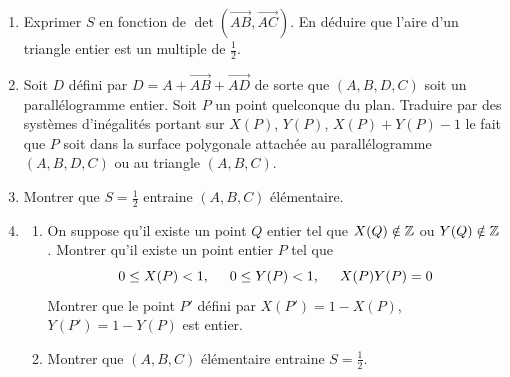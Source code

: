 \begin{enumerate}
 \item Exprimer $S$ en fonction de $\det(\overrightarrow{AB}, \overrightarrow{AC})$. En déduire que l'aire d'un triangle entier est un multiple de $\frac{1}{2}$.
 
 \item Soit $D$ défini par $D = A + \overrightarrow{AB} + \overrightarrow{AD}$ de sorte que $(A,B,D,C)$ soit un parallélogramme entier.\newline
Soit $P$ un point quelconque du plan. Traduire par des systèmes d'inégalités portant sur $X(P)$, $Y(P)$, $X(P)+Y(P)-1$ le fait que $P$ soit dans la surface polygonale attachée au parallélogramme $(A,B,D,C)$ ou au triangle $(A,B,C)$. 

 \item Montrer que $S=\frac{1}{2}$ entraine $(A,B,C)$ élémentaire.
 
 \item  
 \begin{enumerate}
   \item On suppose qu'il existe un point $Q$ entier tel que $X(Q)\notin \mathbb{Z}$ ou $Y(Q)\notin \mathbb{Z}$. Montrer qu'il existe un point entier $P$ tel que 
   \begin{displaymath}
     0\leq X(P) < 1, \hspace{0.5cm} 0\leq Y(P) < 1 , \hspace{0.5cm} X(P)Y(P) = 0
   \end{displaymath}
   Montrer que le point $P'$ défini par $X(P') = 1 - X(P)$, $Y(P') = 1-Y(P)$ est entier.
   
   \item Montrer que $(A, B, C)$ élémentaire entraine $S = \frac{1}{2}$.
 \end{enumerate}
  
\end{enumerate}

